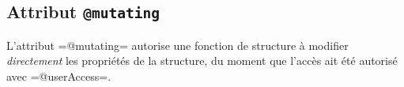 \subsection{Attribut \texttt{@mutating}}

L'attribut \plm=@mutating= autorise une fonction de structure à modifier \emph{directement} les propriétés de la structure, du moment que l'accès ait été autorisé avec \plm=@userAccess=.


%
%  
%
%
%  
%
%





